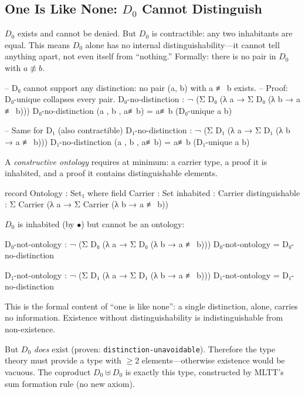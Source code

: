 \documentclass[11pt,a4paper]{article}
\begin{document}
\subsection{One Is Like None: $D_0$ Cannot Distinguish}

$D_0$ exists and cannot be denied. But $D_0$ is contractible: any two
inhabitants are equal. This means $D_0$ alone has no internal
distinguishability---it cannot tell anything apart, not even itself from
``nothing.'' Formally: there is no pair in $D_0$ with $a \not\equiv b$.

\begin{code}
-- D₀ cannot support any distinction: no pair (a, b) with a ≢ b exists.
-- Proof: D₀-unique collapses every pair.
D₀-no-distinction : ¬ (Σ D₀ (λ a → Σ D₀ (λ b → a ≢ b)))
D₀-no-distinction (a , b , a≢b) = a≢b (D₀-unique a b)

-- Same for D₁ (also contractible)
D₁-no-distinction : ¬ (Σ D₁ (λ a → Σ D₁ (λ b → a ≢ b)))
D₁-no-distinction (a , b , a≢b) = a≢b (D₁-unique a b)
\end{code}

A \emph{constructive ontology} requires at minimum: a carrier type, a proof
it is inhabited, and a proof it contains distinguishable elements.

\begin{code}
record Ontology : Set₁ where
  field
    Carrier        : Set
    inhabited      : Carrier
    distinguishable : Σ Carrier (λ a → Σ Carrier (λ b → a ≢ b))
\end{code}

$D_0$ is inhabited (by $\bullet$) but cannot be an ontology:

\begin{code}
D₀-not-ontology : ¬ (Σ D₀ (λ a → Σ D₀ (λ b → a ≢ b)))
D₀-not-ontology = D₀-no-distinction

D₁-not-ontology : ¬ (Σ D₁ (λ a → Σ D₁ (λ b → a ≢ b)))
D₁-not-ontology = D₁-no-distinction
\end{code}

This is the formal content of ``one is like none'': a single distinction,
alone, carries no information. Existence without distinguishability is
indistinguishable from non-existence.

But $D_0$ \emph{does} exist (proven: \texttt{distinction-unavoidable}).
Therefore the type theory must provide a type with $\geq 2$ elements---otherwise
existence would be vacuous. The coproduct $D_0 \uplus D_0$ is exactly
this type, constructed by MLTT's sum formation rule (no new axiom).
\end{document}
